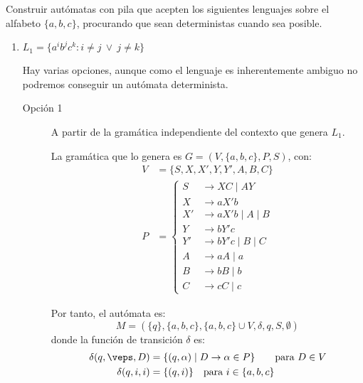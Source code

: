 \documentclass[12pt]{article}
\begin{document}
    \begin{ejercicio}[2.5 puntos]
        Construir autómatas con pila que acepten los siguientes lenguajes sobre el alfabeto $\{a, b, c\}$, procurando que sean deterministas cuando sea posible.
        \begin{enumerate}
            \item $L_1 = \{a^i b^j c^k : i \neq j ~\lor~ j \neq k\}$
            
            Hay varias opciones, aunque como el lenguaje es inherentemente ambiguo no podremos conseguir un autómata determinista.
            \begin{description}
                \item[Opción 1] A partir de la gramática independiente del contexto que genera $L_1$.
                
                La gramática que lo genera es $G=(V,\{a,b,c\},P,S)$, con:
                \begin{equation*}
                    \begin{aligned}
                        V &= \{ S, X,X',Y,Y',A,B,C \} \\
                        P &= \left\{
                            \begin{aligned}
                                S &\rightarrow XC \mid AY \\
                                X &\rightarrow aX'b\\
                                X' &\rightarrow aX'b \mid A \mid B\\
                                Y &\rightarrow bY'c\\
                                Y' &\rightarrow bY'c \mid B \mid C\\
                                A &\rightarrow aA \mid a \\
                                B &\rightarrow bB \mid b \\
                                C &\rightarrow cC \mid c
                            \end{aligned}
                        \right.
                    \end{aligned}
                \end{equation*}

                Por tanto, el autómata es:
                \begin{equation*}
                    M=(\{q\},\{a,b,c\},\{a,b,c\}\cup V,\delta,q,S,\emptyset)
                \end{equation*}
                donde la función de transición $\delta$ es:
                \begin{align*}
                    \delta(q,\veps,D) &= \{(q,\alpha)\mid D\rightarrow \alpha\in P\}\qquad \text{para } D\in V\\
                    \delta(q,i,i) &= \{(q,i)\} \quad \text{para } i\in \{a,b,c\}
                \end{align*}


\end{description}
\end{enumerate}
\end{ejercicio}
\end{document}
